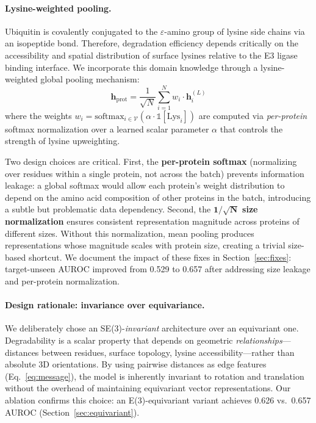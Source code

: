 \documentclass[sigconf]{acmart}
\begin{document}
\paragraph{Lysine-weighted pooling.}
Ubiquitin is covalently conjugated to the $\varepsilon$-amino group of lysine side chains via an isopeptide bond.
Therefore, degradation efficiency depends critically on the accessibility and spatial distribution of surface lysines relative to the E3 ligase binding interface.
We incorporate this domain knowledge through a lysine-weighted global pooling mechanism:
\begin{equation}
    \mathbf{h}_{\text{prot}} = \frac{1}{\sqrt{N}} \sum_{i=1}^{N} w_i \cdot \mathbf{h}_i^{(L)}
    \label{eq:lyspool}
\end{equation}
where the weights $w_i = \text{softmax}_{i \in \mathcal{V}}\!\left(\alpha \cdot \mathbb{1}[\text{Lys}_i]\right)$ are computed via \emph{per-protein} softmax normalization over a learned scalar parameter $\alpha$ that controls the strength of lysine upweighting.

Two design choices are critical.
First, the \textbf{per-protein softmax} (normalizing over residues within a single protein, not across the batch) prevents information leakage: a global softmax would allow each protein's weight distribution to depend on the amino acid composition of other proteins in the batch, introducing a subtle but problematic data dependency.
Second, the $\mathbf{1/\sqrt{N}}$ \textbf{size normalization} ensures consistent representation magnitude across proteins of different sizes.
Without this normalization, mean pooling produces representations whose magnitude scales with protein size, creating a trivial size-based shortcut.
We document the impact of these fixes in Section~\ref{sec:fixes}: target-unseen AUROC improved from 0.529 to 0.657 after addressing size leakage and per-protein normalization.

\paragraph{Design rationale: invariance over equivariance.}
We deliberately chose an SE(3)-\emph{invariant} architecture over an equivariant one.
Degradability is a scalar property that depends on geometric \emph{relationships}---distances between residues, surface topology, lysine accessibility---rather than absolute 3D orientations.
By using pairwise distances as edge features (Eq.~\ref{eq:message}), the model is inherently invariant to rotation and translation without the overhead of maintaining equivariant vector representations.
Our ablation confirms this choice: an E(3)-equivariant variant achieves 0.626 vs.\ 0.657 AUROC (Section~\ref{sec:equivariant}).
\end{document}
